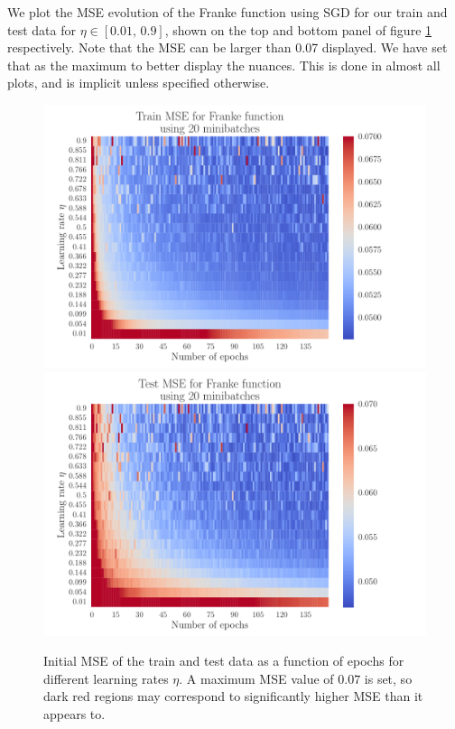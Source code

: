 \documentclass[12pt]{extarticle}
\begin{document}
We plot the MSE evolution of the Franke function using SGD for our train and test data for $\eta\in[0.01,\,0.9]$, shown on the top and bottom panel of figure \ref{fig:SGD_Franke_epochs_eta_overfit} respectively. Note that the MSE can be larger than 0.07 displayed. We have set that as the maximum to better display the nuances. This is done in almost all plots, and is implicit unless specified otherwise.

\begin{figure}[h!]
	\includegraphics[width=\linewidth]{SGD_Franke/reg_Franke__epochs_eta__Train_MSE__overfit_489047.pdf}
	\includegraphics[width=\linewidth]{SGD_Franke/reg_Franke__epochs_eta__Test_MSE__overfit_395885.pdf}
	\caption{Initial MSE of the train and test data as a function of epochs for different learning rates $\eta$. A maximum MSE value of $0.07$ is set, so dark red regions may correspond to significantly higher MSE than it appears to.}
	\label{fig:SGD_Franke_epochs_eta_overfit}
\end{figure}
\end{document}
